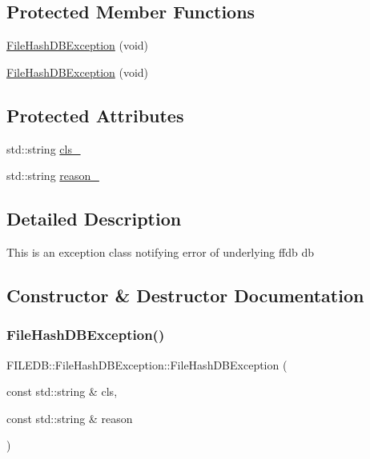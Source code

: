 \subsection*{Protected Member Functions}
\begin{DoxyCompactItemize}
\item 
\mbox{\hyperlink{classFILEDB_1_1FileHashDBException_a7cbe99c797d9edf2d2e123d3aacaba76}{File\+Hash\+D\+B\+Exception}} (void)
\item 
\mbox{\hyperlink{classFILEDB_1_1FileHashDBException_a7cbe99c797d9edf2d2e123d3aacaba76}{File\+Hash\+D\+B\+Exception}} (void)
\end{DoxyCompactItemize}
\subsection*{Protected Attributes}
\begin{DoxyCompactItemize}
\item 
std\+::string \mbox{\hyperlink{classFILEDB_1_1FileHashDBException_a758ffa21cceee63da7f40d93c6e0c2b3}{cls\+\_\+}}
\item 
std\+::string \mbox{\hyperlink{classFILEDB_1_1FileHashDBException_a03d9f75945799fec0e00195daed5aaad}{reason\+\_\+}}
\end{DoxyCompactItemize}


\subsection{Detailed Description}
This is an exception class notifying error of underlying ffdb db 

\subsection{Constructor \& Destructor Documentation}
\mbox{\label{classFILEDB_1_1FileHashDBException_ae549056e12f10f0bb24e0875a70ec57b}} 
\subsubsection{\texorpdfstring{FileHashDBException()}{FileHashDBException()}\hspace{0.1cm}{\footnotesize\ttfamily [1/6]}}
{\footnotesize\ttfamily F\+I\+L\+E\+D\+B\+::\+File\+Hash\+D\+B\+Exception\+::\+File\+Hash\+D\+B\+Exception (\begin{DoxyParamCaption}\item[{const std\+::string \&}]{cls,  }\item[{const std\+::string \&}]{reason }\end{DoxyParamCaption})}

